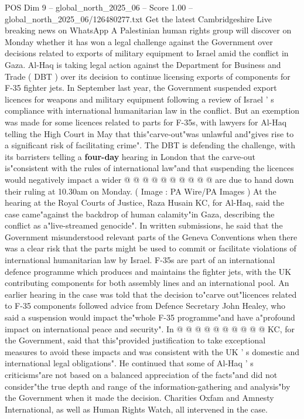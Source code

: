 \begin{textsample}{POS Dim 9 – global\_north\_2025\_06 – Score 1.00 – global\_north\_2025\_06/126480277.txt}  \label{ex:f9_pos_377}
Get the latest Cambridgeshire Live breaking news on WhatsApp A Palestinian human rights group will discover on Monday whether it has won a legal challenge against the Government over decisions related to exports of military equipment to Israel amid the conflict in Gaza.
Al-Haq is taking legal action against the Department for Business and Trade ( DBT ) over its decision to continue licensing exports of components for F-35 fighter jets.
In September last year, the Government suspended export licences for weapons and military equipment following a review of Israel ' s compliance with international humanitarian law in the conflict.
But an exemption was made for some licences related to parts for F-35s, with lawyers for Al-Haq telling the High Court in May that this"carve-out"was unlawful and"gives rise to a significant risk of facilitating crime".
The DBT is defending the challenge, with its barristers telling a \textbf{four-day} hearing in London that the carve-out is"consistent with the rules of international law"and that suspending the licences would negatively impact a wider @ @ @ @ @ @ @ @ @ @ are due to hand down their ruling at 10.30am on Monday. ( Image : PA Wire/PA Images ) At the hearing at the Royal Courts of Justice, Raza Husain KC, for Al-Haq, said the case came"against the backdrop of human calamity"in Gaza, describing the conflict as a"live-streamed genocide".
In written submissions, he said that the Government misunderstood relevant parts of the Geneva Conventions when there was a clear risk that the parts might be used to commit or facilitate violations of international humanitarian law by Israel.
F-35s are part of an international defence programme which produces and maintains the fighter jets, with the UK contributing components for both assembly lines and an international pool.
An earlier hearing in the case was told that the decision to"carve out"licences related to F-35 components followed advice from Defence Secretary John Healey, who said a suspension would impact the"whole F-35 programme"and have a"profound impact on international peace and security".
In @ @ @ @ @ @ @ @ @ @ KC, for the Government, said that this"provided justification to take exceptional measures to avoid these impacts and was consistent with the UK ' s domestic and international legal obligations".
He continued that some of Al-Haq ' s criticisms"are not based on a balanced appreciation of the facts"and did not consider"the true depth and range of the information-gathering and analysis"by the Government when it made the decision.
Charities Oxfam and Amnesty International, as well as Human Rights Watch, all intervened in the case.

\end{textsample}
